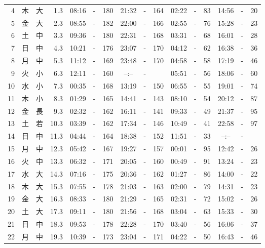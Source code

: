 \documentclass[12pt.a4j]{jsarticle}
\begin{document}
\begin{center}
\begin{table}[ht]
\begin{tabular}{|rc|cr|ccrccr|ccrccr|}
 4 & 木 & 大 &  1.3 &  08:16 &-& 180  &  21:32 &-& 164  &   02:22 &-&  83  &   14:56 &-&  20  \\
 5 & 金 & 大 &  2.3 &  08:55 &-& 182  &  22:00 &-& 166  &   02:55 &-&  76  &   15:28 &-&  23  \\
 6 & 土 & 中 &  3.3 &  09:36 &-& 180  &  22:31 &-& 168  &   03:31 &-&  68  &   16:01 &-&  28  \\
 7 & 日 & 中 &  4.3 &  10:21 &-& 176  &  23:07 &-& 170  &   04:12 &-&  62  &   16:38 &-&  36  \\
 8 & 月 & 中 &  5.3 &  11:12 &-& 169  &  23:48 &-& 170  &   04:58 &-&  58  &   17:19 &-&  46  \\
 9 & 火 & 小 &  6.3 &  12:11 &-& 160  &  --:-- &-&     &   05:51 &-&  56  &   18:06 &-&  60  \\
10 & 水 & 小 &  7.3 &  00:35 &-& 168  &  13:19 &-& 150  &   06:55 &-&  55  &   19:01 &-&  74  \\
11 & 木 & 小 &  8.3 &  01:29 &-& 165  &  14:41 &-& 143  &   08:10 &-&  54  &   20:12 &-&  87  \\
12 & 金 & 長 &  9.3 &  02:32 &-& 162  &  16:11 &-& 141  &   09:33 &-&  49  &   21:37 &-&  95  \\
13 & 土 & 若 & 10.3 &  03:39 &-& 162  &  17:34 &-& 146  &   10:49 &-&  41  &   22:58 &-&  97  \\
14 & 日 & 中 & 11.3 &  04:44 &-& 164  &  18:38 &-& 152  &   11:51 &-&  33  &   --:-- &-&     \\
15 & 月 & 中 & 12.3 &  05:42 &-& 167  &  19:27 &-& 157  &   00:01 &-&  95  &   12:42 &-&  26  \\
16 & 火 & 中 & 13.3 &  06:32 &-& 171  &  20:05 &-& 160  &   00:49 &-&  91  &   13:24 &-&  23  \\
17 & 水 & 大 & 14.3 &  07:16 &-& 175  &  20:36 &-& 162  &   01:27 &-&  86  &   14:00 &-&  22  \\
18 & 木 & 大 & 15.3 &  07:55 &-& 178  &  21:03 &-& 163  &   02:00 &-&  79  &   14:31 &-&  23  \\
19 & 金 & 大 & 16.3 &  08:33 &-& 180  &  21:29 &-& 165  &   02:31 &-&  72  &   15:02 &-&  26  \\
20 & 土 & 大 & 17.3 &  09:11 &-& 180  &  21:56 &-& 168  &   03:04 &-&  63  &   15:33 &-&  30  \\
21 & 日 & 中 & 18.3 &  09:53 &-& 178  &  22:28 &-& 170  &   03:40 &-&  56  &   16:06 &-&  37  \\
22 & 月 & 中 & 19.3 &  10:39 &-& 173  &  23:04 &-& 171  &   04:22 &-&  50  &   16:43 &-&  46  \\

\end{tabular}
\end{table}
\end{center}
\end{document}
